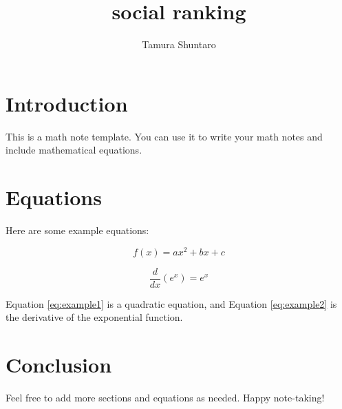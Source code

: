\documentclass{article}
\title{social ranking}
\author{Tamura Shuntaro}
\begin{document}
\maketitle

\section{Introduction}

This is a math note template. You can use it to write your math notes and include mathematical equations.

\section{Equations}

Here are some example equations:

\begin{equation}
    \label{eq:example1}
    f(x) = ax^2 + bx + c
\end{equation}

\begin{equation}
    \label{eq:example2}
    \frac{d}{dx} \left( e^x \right) = e^x
\end{equation}

Equation \ref{eq:example1} is a quadratic equation, and Equation \ref{eq:example2} is the derivative of the exponential function.

\section{Conclusion}

Feel free to add more sections and equations as needed. Happy note-taking!
\end{document}
